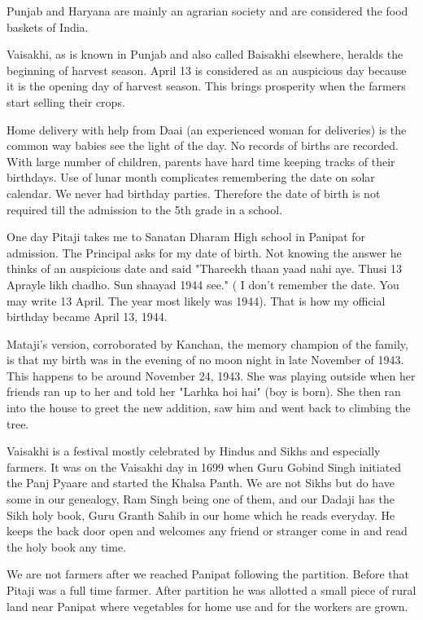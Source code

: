 Punjab and Haryana are mainly an agrarian society and are considered the
food baskets of India. 

Vaisakhi, as is known in Punjab and also called Baisakhi elsewhere,
heralds the beginning of harvest season. April 13 is considered as an
auspicious day because it is the opening day of harvest season. This
brings prosperity when the farmers start selling their crops. 

Home delivery with help from Daai (an experienced woman for deliveries) is
the common way babies see the light of the day. No records of births are
recorded. With large number of children, parents have hard time keeping
tracks of their birthdays. Use of lunar month complicates remembering the
date on solar calendar. We never had birthday parties. Therefore the date
of birth is not required till the admission to the 5th grade in a school. 

One day Pitaji takes me to Sanatan Dharam High school in Panipat for
admission. The Principal asks for my date of birth. Not knowing the answer
he thinks of an auspicious date and said "Thareekh thaan yaad nahi aye.
Thusi 13 Aprayle likh chadho. Sun shaayad 1944 see." ( I don't remember
the date. You may write 13 April. The year most likely was 1944). That is
how my official birthday became April 13, 1944. 

Mataji’s version, corroborated by Kanchan, the memory champion of the
family, is that my birth was in the evening of no moon night in late
November of 1943. This happens to be around November 24, 1943.  She was
playing outside when her friends ran up to her and told her "Larhka hoi
hai" (boy is born). She then ran into the house to greet the new addition,
saw him and went back to climbing the tree. 

Vaisakhi is a festival mostly celebrated by Hindus and Sikhs and
especially farmers. It was on the Vaisakhi day in 1699 when Guru Gobind
Singh initiated the Panj Pyaare and started the Khalsa Panth. We are not
Sikhs but do have some in our genealogy, Ram Singh being one of them, and
our Dadaji has the Sikh holy book, Guru Granth Sahib in our home which he
reads everyday. He keeps the back door open and welcomes any friend or
stranger come in and read the holy book any time. 

We are not farmers after we reached Panipat following the partition.
Before that Pitaji was a full time farmer. After partition he was allotted
a small piece of rural land near Panipat where vegetables for home use and
for the workers are grown. 


